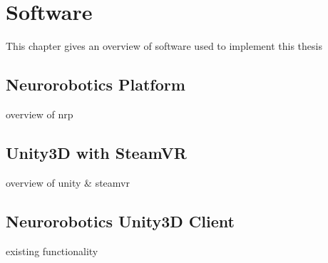 
\chapter{Software}\label{chapter:Software}

This chapter gives an overview of software used to implement this thesis


\section{Neurorobotics Platform}
overview of nrp

\section{Unity3D with SteamVR}
overview of unity \& steamvr

\section{Neurorobotics Unity3D Client}
existing functionality
